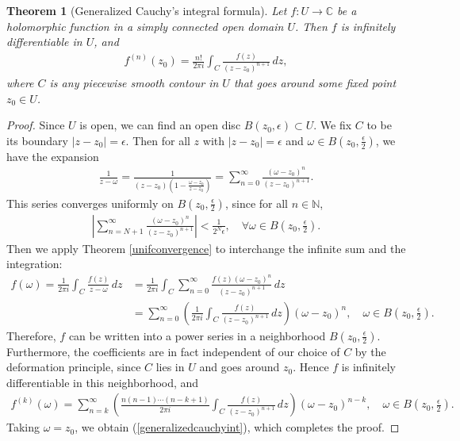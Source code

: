 \documentclass{article}
\numberwithin{equation}{section}
\newcommand{\bbC}{\mathbb{C}}
\newcommand{\bbN}{\mathbb{N}}
\theoremstyle{plain}
\newtheorem{theorem}{Theorem}[section]
\theoremstyle{definition}
\begin{document}
\begin{theorem}[Generalized Cauchy's integral formula]\label{generalcauchy}
Let $f:U\to\bbC$ be a holomorphic function in a simply connected open domain $U$. Then $f$ is infinitely differentiable in $U$, and 
\begin{align}
	f^{(n)}(z_0)=\frac{n!}{2\pi i}\int_C\frac{f(z)}{(z-z_0)^{n+1}}\,dz,\label{generalizedcauchyint}
\end{align}
where $C$ is any piecewise smooth contour in $U$ that goes around some fixed point $z_0\in U$.
\end{theorem}
\begin{proof}
Since $U$ is open, we can find an open disc $B(z_0,\epsilon)\subset U$. We fix $C$ to be its boundary $\vert z-z_0\vert=\epsilon$. Then for all $z$ with $\vert z-z_0\vert=\epsilon$ and $\omega\in B(z_0,\frac{\epsilon}{2})$, we have the expansion
\begin{align}
	\frac{1}{z-\omega}=\frac{1}{(z-z_0)\left(1-\frac{\omega-z_0}{z-z_0}\right)}=\sum_{n=0}^\infty\frac{(\omega-z_0)^n}{(z-z_0)^{n+1}}.\label{geometricexp}
\end{align}
This series converges uniformly on $B(z_0,\frac{\epsilon}{2})$, since for all $n\in\bbN$,
\begin{align*}
	\left\vert\sum_{n=N+1}^\infty\frac{(\omega-z_0)^n}{(z-z_0)^{n+1}}\right\vert<\frac{1}{2^N\epsilon},\quad\forall\omega\in B\left(z_0,\frac{\epsilon}{2}\right).
\end{align*}
Then we apply Theorem \ref{unifconvergence} to interchange the infinite sum and the integration:
\begin{align*}
	f(\omega)=\frac{1}{2\pi i}\int_C\frac{f(z)}{z-\omega}\,dz&=\frac{1}{2\pi i}\int_C\sum_{n=0}^\infty\frac{f(z)(\omega-z_0)^n}{(z-z_0)^{n+1}}\,dz\\
	&=\sum_{n=0}^\infty\left(\frac{1}{2\pi i}\int_C\frac{f(z)}{(z-z_0)^{n+1}}\,dz\right)(\omega-z_0)^n,\quad\omega\in B\left(z_0,\frac{\epsilon}{2}\right).
\end{align*}
Therefore, $f$ can be written into a power series in a neighborhood $B(z_0,\frac{\epsilon}{2})$. Furthermore, the coefficients are in fact independent of our choice of $C$ by the deformation principle, since $C$ lies in $U$ and goes around $z_0$. Hence $f$ is infinitely differentiable in this neighborhood, and
\begin{align*}
	f^{(k)}(\omega)=\sum_{n=k}^\infty\left(\frac{n(n-1)\cdots(n-k+1)}{2\pi i}\int_C\frac{f(z)}{(z-z_0)^{n+1}}\,dz\right)(\omega-z_0)^{n-k},\quad\omega\in B\left(z_0,\frac{\epsilon}{2}\right).
\end{align*}
Taking $\omega=z_0$, we obtain (\ref{generalizedcauchyint}), which completes the proof.
\end{proof}
\end{document}

